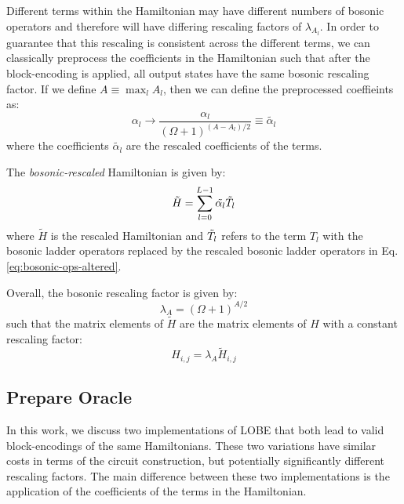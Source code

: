 Different terms within the Hamiltonian may have different numbers of bosonic operators and therefore will have differing rescaling factors of $\lambda_{A_l}$.
In order to guarantee that this rescaling is consistent across the different terms, we can classically preprocess the coefficients in the Hamiltonian such that after the block-encoding is applied, all output states have the same bosonic rescaling factor.
If we define $A \equiv \max_l{A_l}$, then we can define the preprocessed coeffieints as:
\begin{equation}
    \label{eq:bosonic-coeff-rescaling}
    \alpha_l \rightarrow \frac{\alpha_l}{(\Omega + 1)^{(A - A_l)/2}} \equiv \tilde{\alpha_l}
\end{equation}
where the coefficients $\tilde{\alpha_l}$ are the rescaled coefficients of the terms.

The \textit{bosonic-rescaled} Hamiltonian is given by:
\begin{equation}
    \tilde{H} = \sum_{l=0}^{L-1} \tilde{\alpha_l} \Tilde{T}_l
\end{equation}
where $\tilde{H}$ is the rescaled Hamiltonian and $\Tilde{T}_l$ refers to the term $T_l$ with the bosonic ladder operators replaced by the rescaled bosonic ladder operators in Eq. \ref{eq:bosonic-ops-altered}.

Overall, the bosonic rescaling factor is given by:
\begin{equation}
    \label{eq:bosonic-rescaling-factor}
    \lambda_A = (\Omega + 1)^{A/2}
\end{equation}
such that the matrix elements of $\tilde{H}$ are the matrix elements of $H$ with a constant rescaling factor:
\begin{equation}
    H_{i,j} = \lambda_A \tilde{H}_{i,j}
\end{equation}

\subsection{Prepare Oracle}
\label{subsec:prepare}

In this work, we discuss two implementations of LOBE that both lead to valid block-encodings of the same Hamiltonians.
These two variations have similar costs in terms of the circuit construction, but potentially significantly different rescaling factors.
The main difference between these two implementations is the application of the coefficients of the terms in the Hamiltonian.

